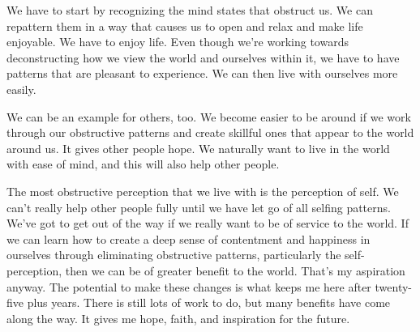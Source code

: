 We have to start by recognizing the mind states that obstruct us. We can repattern them in a way that causes us to open and relax and make life enjoyable. We have to enjoy life. Even though we're working towards deconstructing how we view the world and ourselves within it, we have to have patterns that are pleasant to experience. We can then live with ourselves more easily.

We can be an example for others, too. We become easier to be around if we work through our obstructive patterns and create skillful ones that appear to the world around us. It gives other people hope. We naturally want to live in the world with ease of mind, and this will also help other people.

The most obstructive perception that we live with is the perception of self. We can't really help other people fully until we have let go of all selfing patterns. We've got to get out of the way if we really want to be of service to the world. If we can learn how to create a deep sense of contentment and happiness in ourselves through eliminating obstructive patterns, particularly the self-perception, then we can be of greater benefit to the world. That's my aspiration anyway. The potential to make these changes is what keeps me here after twenty-five plus years. There is still lots of work to do, but many benefits have come along the way. It gives me hope, faith, and inspiration for the future.
